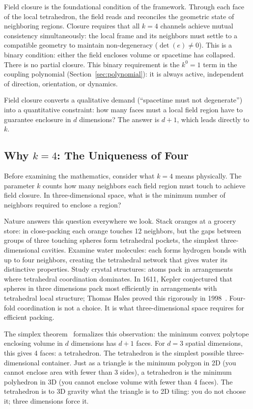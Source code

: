 \documentclass[aps,prd,preprint,superscriptaddress,showpacs,preprintnumbers,amsmath,amssymb,nofootinbib]{revtex4-2}
\begin{document}
Field closure is the foundational condition of the framework. Through each face of the local tetrahedron, the field reads and reconciles the geometric state of neighboring regions. Closure requires that all $k = 4$ channels achieve mutual consistency simultaneously: the local frame and its neighbors must settle to a compatible geometry to maintain non-degeneracy ($\det(e) \neq 0$). This is a binary condition: either the field encloses volume or spacetime has collapsed. There is no partial closure. This binary requirement is the $k^0 = 1$ term in the coupling polynomial (Section~\ref{sec:polynomial}): it is always active, independent of direction, orientation, or dynamics.

Field closure converts a qualitative demand (``spacetime must not degenerate'') into a quantitative constraint: how many faces must a local field region have to guarantee enclosure in $d$ dimensions? The answer is $d + 1$, which leads directly to $k$.

\subsection{Why $k = 4$: The Uniqueness of Four}
\label{subsec:k4}

Before examining the mathematics, consider what $k = 4$ means physically. The parameter $k$ counts how many neighbors each field region must touch to achieve field closure. In three-dimensional space, what is the minimum number of neighbors required to enclose a region?

Nature answers this question everywhere we look. Stack oranges at a grocery store: in close-packing each orange touches 12 neighbors, but the gaps between groups of three touching spheres form tetrahedral pockets, the simplest three-dimensional cavities. Examine water molecules: each forms hydrogen bonds with up to four neighbors, creating the tetrahedral network that gives water its distinctive properties. Study crystal structures: atoms pack in arrangements where tetrahedral coordination dominates. In 1611, Kepler conjectured that spheres in three dimensions pack most efficiently in arrangements with tetrahedral local structure; Thomas Hales proved this rigorously in 1998~\cite{hales2005}. Four-fold coordination is not a choice. It is what three-dimensional space requires for efficient packing.

The simplex theorem~\cite{ziegler1995} formalizes this observation: the minimum convex polytope enclosing volume in $d$ dimensions has $d+1$ faces. For $d = 3$ spatial dimensions, this gives 4 faces: a tetrahedron. The tetrahedron is the simplest possible three-dimensional container. Just as a triangle is the minimum polygon in 2D (you cannot enclose area with fewer than 3 sides), a tetrahedron is the minimum polyhedron in 3D (you cannot enclose volume with fewer than 4 faces). The tetrahedron is to 3D gravity what the triangle is to 2D tiling: you do not choose it; three dimensions force it.
\end{document}
